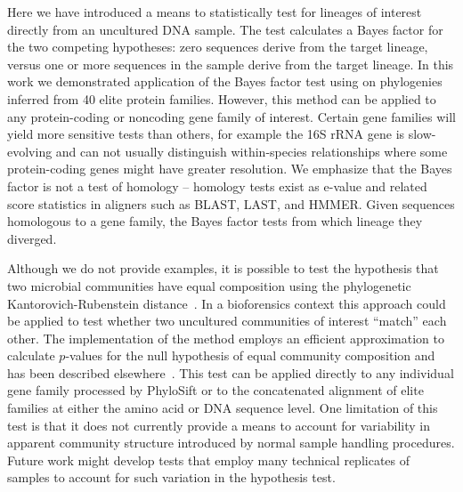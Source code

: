\documentclass[10pt]{article}
\begin{document}
Here we have introduced a means to statistically test for lineages of interest directly from an uncultured DNA sample.
The test calculates a Bayes factor for the two competing hypotheses: zero sequences derive from the target lineage, versus one or more sequences in the sample derive from the target lineage.
In this work we demonstrated application of the Bayes factor test using on phylogenies inferred from 40 elite protein families.
However, this method can be applied to any protein-coding or noncoding gene family of interest.
Certain gene families will yield more sensitive tests than others, for example the 16S rRNA gene is slow-evolving and can not usually distinguish within-species relationships where some protein-coding genes might have greater resolution.
We emphasize that the Bayes factor is not a test of homology -- homology tests exist as e-value and related score statistics in aligners such as BLAST, LAST, and HMMER.
Given sequences homologous to a gene family, the Bayes factor tests from which lineage they diverged.

Although we do not provide examples, it is possible to test the hypothesis that two microbial communities have equal composition using the phylogenetic Kantorovich-Rubenstein distance~\cite{Evans2010}.
In a bioforensics context this approach could be applied to test whether two uncultured communities of interest ``match'' each other.
The implementation of the method employs an efficient approximation to calculate $p$-values for the null hypothesis of equal community composition and has been described elsewhere~\cite{Evans2010}.
This test can be applied directly to any individual gene family processed by PhyloSift or to the concatenated alignment of elite families at either the amino acid or DNA sequence level.
One limitation of this test is that it does not currently provide a means to account for variability in apparent community structure introduced by normal sample handling procedures.
Future work might develop tests that employ many technical replicates of samples to account for such variation in the hypothesis test.
\end{document}
